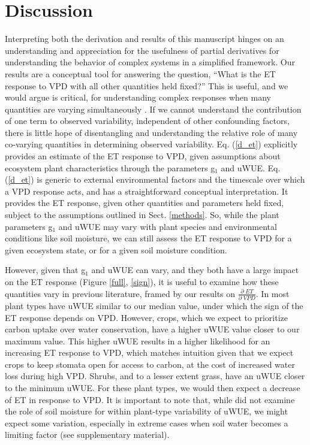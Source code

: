 \section{Discussion}
\label{discussion}

Interpreting both the derivation and results of this manuscript hinges
on an understanding and appreciation for the usefulness of partial
derivatives for understanding the behavior of complex systems in a
simplified framework. Our results are a conceptual tool for answering
the question, ``What is the ET response to VPD with all other
quantities held fixed?'' This is useful, and we would argue is
critical, for understanding complex responses when many quantities are
varying simultaneously \cite{Zhou_2019}. If we cannot understand the
contribution of one term to observed variability, independent of other
confounding factors, there is little hope of disentangling and
understanding the relative role of many co-varying quantities in
determining observed variability.  Eq. (\ref{d_et}) explicitly
provides an estimate of the ET response to VPD, given assumptions
about ecosystem plant characteristics through the parameters g$_1$ and
uWUE. Eq. (\ref{d_et}) is generic to external environmental factors
and the timescale over which a VPD response acts, and has a
straightforward conceptual interpretation. It provides the ET
response, given other quantities and parameters held fixed, subject to
the assumptions outlined in Sect. \ref{methods}. So, while the plant
parameters g$_1$ and uWUE may vary with plant species and
environmental conditions like soil moisture, we can still assess the
ET response to VPD for a given ecosystem state, or for a given soil
moisture condition.

However, given that g$_1$ and uWUE can vary, and they both have a
large impact on the ET response (Figure \ref{full}, \ref{sign}), it is
useful to examine how these quantities vary in previous literature,
framed by our results on $\frac{\partial \; ET}{\partial \; VPD}$. In
 most plant types have uWUE similar to our median
value, under which the sign of the ET response depends on
VPD. However, crops, which we expect to prioritize carbon uptake over
water conservation, have a higher uWUE value closer to our maximum
value. This higher uWUE results in a higher likelihood for an
increasing ET response to VPD, which matches intuition given that we
expect crops to keep stomata open for access to carbon, at the cost of
increased water loss during high VPD. Shrubs, and to a lesser extent
grass, have an uWUE closer to the minimum uWUE. For these plant types,
we would then expect a decrease of ET in response to VPD. It is
important to note that, while  did not examine the
role of soil moisture for within plant-type variability of uWUE, we
might expect some variation, especially in extreme cases when soil
water becomes a limiting factor (see supplementary material).

